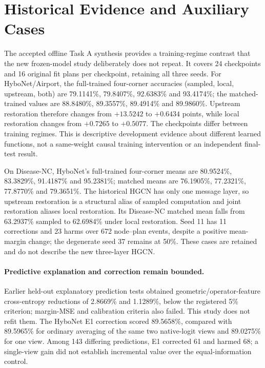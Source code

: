 \section{Historical Evidence and Auxiliary Cases}
\label{sec:historical-results}
The accepted offline Task A synthesis provides a training-regime contrast that the new frozen-model study deliberately does not repeat. It covers 24 checkpoints and 16 original fit plans per checkpoint, retaining all three seeds. For HyboNet/Airport, the full-trained four-corner accuracies (sampled, local, upstream, both) are 79.1141\%, 79.8407\%, 92.6383\% and 93.4174\%; the matched-trained values are 88.8480\%, 89.3557\%, 89.4914\% and 89.9860\%. Upstream restoration therefore changes from $+13.5242$ to $+0.6434$ points, while local restoration changes from $+0.7265$ to $+0.5077$. The checkpoints differ between training regimes. This is descriptive development evidence about different learned functions, not a same-weight causal training intervention or an independent final-test result.

On Disease-NC, HyboNet's full-trained four-corner means are 80.9524\%, 83.3829\%, 91.4187\% and 95.2381\%; matched means are 76.1905\%, 77.2321\%, 77.8770\% and 79.3651\%. The historical HGCN has only one message layer, so upstream restoration is a structural alias of sampled computation and joint restoration aliases local restoration. Its Disease-NC matched mean falls from 63.2937\% sampled to 62.6984\% under local restoration. Seed 11 has 11 corrections and 23 harms over 672 node--plan events, despite a positive mean-margin change; the degenerate seed 37 remains at 50\%. These cases are retained and do not describe the new three-layer HGCN.

\paragraph{Predictive explanation and correction remain bounded.}
Earlier held-out explanatory prediction tests obtained geometric/operator-feature cross-entropy reductions of 2.8669\% and 1.1289\%, below the registered 5\% criterion; margin-MSE and calibration criteria also failed. This study does not refit them. The HyboNet E1 correction scored 89.5658\%, compared with 89.5965\% for ordinary averaging of the same two native-logit views and 89.0275\% for one view. Among 143 differing predictions, E1 corrected 61 and harmed 68; a single-view gain did not establish incremental value over the equal-information control.

